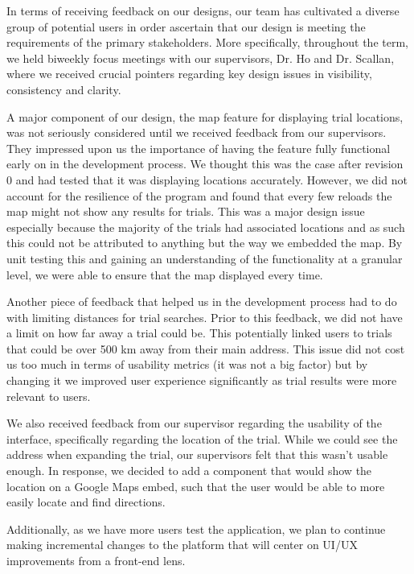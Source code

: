 \documentclass[12pt, titlepage]{article}
\begin{document}
In terms of receiving feedback on our designs, our team has cultivated a diverse group of potential users
in order ascertain that our design is meeting the requirements of the primary stakeholders.
More specifically, throughout the term,
we held biweekly focus meetings with our supervisors, Dr. Ho and Dr. Scallan, where we received crucial
pointers regarding key design issues in visibility, consistency and clarity. \newline

A major component of our design, the map feature for displaying trial locations,
was not seriously considered until we received feedback from our supervisors. They impressed upon
us the importance of having the feature fully functional early on in the development process.
We thought this was the case after revision 0 and had tested that it was displaying locations
accurately. However, we did not account for the resilience of the program and found that every few reloads
the map might not show any results for trials. This was a major design issue
especially because the majority of the trials had associated locations and as such this could not be
attributed to anything but the way we embedded the map.
By unit testing this and gaining an understanding of the functionality at a granular level,
we were able to ensure that the map displayed every time. \newline

Another piece of feedback that helped us in the development process
had to do with limiting distances for trial searches. Prior to this feedback,
we did not have a limit on how far away a trial could be. This potentially linked
users to trials that could be over 500 km away from their main address. This issue did not
cost us too much in terms of usability metrics (it was not a big factor) but by changing it
we improved user experience significantly as trial results were more relevant to users. \newline

We also received feedback from our supervisor regarding the usability of the interface, specifically regarding
the location of the trial. While we could see the address when expanding the trial, our supervisors felt that this
wasn't usable enough. In response, we decided to add a component that would show the location on a Google
Maps embed, such that the user would be able to more easily locate and find directions. \newline

Additionally, as we have more users test the application, we plan to continue making incremental changes
to the platform that will center on UI/UX improvements from a front-end lens.
\end{document}

